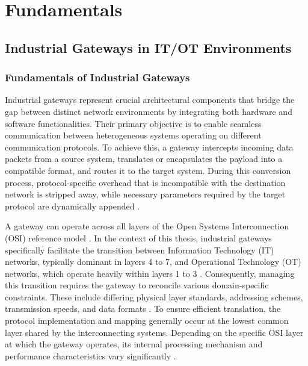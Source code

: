 \chapter{Fundamentals} \label{chap:fundamentals} 


\section{Industrial Gateways in IT/OT Environments} 
\label{sec:industrial_gateways} 

\subsection{Fundamentals of Industrial Gateways}
\label{subsec:industrial_gateways_fundamentals}

Industrial gateways represent crucial architectural components that bridge the gap between distinct network environments by integrating both hardware and software functionalities. Their primary objective is to enable seamless communication between heterogeneous systems operating on different communication protocols. To achieve this, a gateway intercepts incoming data packets from a source system, translates or encapsulates the payload into a compatible format, and routes it to the target system. During this conversion process, protocol-specific overhead that is incompatible with the destination network is stripped away, while necessary parameters required by the target protocol are dynamically appended \cite[pp. 277]{Gsell2026}.

A gateway can operate across all layers of the Open Systems Interconnection (OSI) reference model \cite{elektronikkompendium_gateway}. In the context of this thesis, industrial gateways specifically facilitate the transition between Information Technology (IT) networks, typically dominant in layers 4 to 7, and Operational Technology (OT) networks, which operate heavily within layers 1 to 3 \cite{gfg_osi_model_2026}. Consequently, managing this transition requires the gateway to reconcile various domain-specific constraints. These include differing physical layer standards, addressing schemes, transmission speeds, and data formats \cite{elektronikkompendium_gateway}. 
To ensure efficient translation, the protocol implementation and mapping generally occur at the lowest common layer shared by the interconnecting systems. Depending on the specific OSI layer at which the gateway operates, its internal processing mechanism and performance characteristics vary significantly \cite{hohn2026_gateway}.



